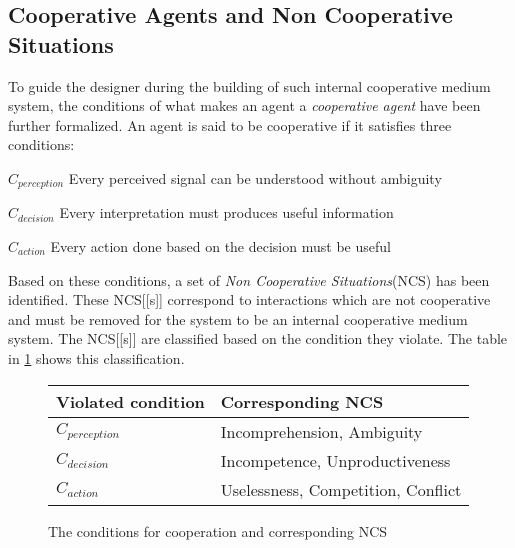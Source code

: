 \subsection{Cooperative Agents and Non Cooperative Situations}

To guide the designer during the building of such internal cooperative medium system, the conditions of what makes an agent a \emph{cooperative agent} have been further formalized. An agent is said to be cooperative if it satisfies three conditions:
\begin{compactitem}
\item $C_{perception}$ Every perceived signal can be understood without ambiguity
\item $C_{decision}$ Every interpretation must produces useful information
\item $C_{action}$ Every action done based on the decision must be useful
\end{compactitem}

Based on these conditions, a set of \emph{Non Cooperative Situations}(NCS) has been identified. These NCS[[s]] correspond to interactions which are not cooperative and must be removed for the system to be an internal cooperative medium system. The NCS[[s]] are classified based on the condition they violate. The table in \figurename{} \ref{NCS} shows this classification.

\begin{figure}
\centering
\begin{tabular}{ll}
\toprule
\textbf{Violated condition}	& \textbf{Corresponding NCS} \\
\midrule
$C_{perception}$ & Incomprehension, Ambiguity\\

$C_{decision}$ & Incompetence, Unproductiveness \\

$C_{action}$ & Uselessness, Competition, Conflict\\
\bottomrule
\end{tabular}
\caption{The conditions for cooperation and corresponding NCS}
\label{NCS}
\end{figure}

